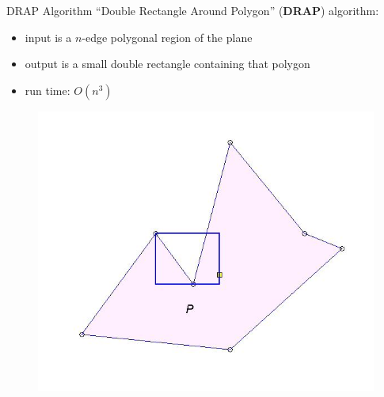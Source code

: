\begin{frame} {DRAP Algorithm}
  ``Double Rectangle Around Polygon'' (\textbf{DRAP}) algorithm:\\
  \begin{itemize}
  \item input is a $n$-edge polygonal region of the plane
  \item output is a small double rectangle containing that polygon
  \item run time: $O(n^3)$
  \end{itemize}
  \begin{figure}
    \includegraphics[scale=0.3]{figs/drap1.jpg}
  \end{figure}
\end{frame}

